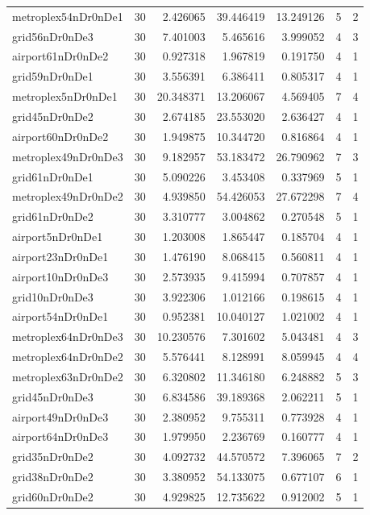 \documentclass[../../../thesis.tex]{subfiles}
\begin{document}
\begin{longtable}{|l|r|r|r|r|r|r|}
metroplex54nDr0nDe1 & 30 & 2.426065 & 39.446419 & 13.249126 & 5 & 2 \\
grid56nDr0nDe3 & 30 & 7.401003 & 5.465616 & 3.999052 & 4 & 3 \\
airport61nDr0nDe2 & 30 & 0.927318 & 1.967819 & 0.191750 & 4 & 1 \\
grid59nDr0nDe1 & 30 & 3.556391 & 6.386411 & 0.805317 & 4 & 1 \\
metroplex5nDr0nDe1 & 30 & 20.348371 & 13.206067 & 4.569405 & 7 & 4 \\
grid45nDr0nDe2 & 30 & 2.674185 & 23.553020 & 2.636427 & 4 & 1 \\
airport60nDr0nDe2 & 30 & 1.949875 & 10.344720 & 0.816864 & 4 & 1 \\
metroplex49nDr0nDe3 & 30 & 9.182957 & 53.183472 & 26.790962 & 7 & 3 \\
grid61nDr0nDe1 & 30 & 5.090226 & 3.453408 & 0.337969 & 5 & 1 \\
metroplex49nDr0nDe2 & 30 & 4.939850 & 54.426053 & 27.672298 & 7 & 4 \\
grid61nDr0nDe2 & 30 & 3.310777 & 3.004862 & 0.270548 & 5 & 1 \\
airport5nDr0nDe1 & 30 & 1.203008 & 1.865447 & 0.185704 & 4 & 1 \\
airport23nDr0nDe1 & 30 & 1.476190 & 8.068415 & 0.560811 & 4 & 1 \\
airport10nDr0nDe3 & 30 & 2.573935 & 9.415994 & 0.707857 & 4 & 1 \\
grid10nDr0nDe3 & 30 & 3.922306 & 1.012166 & 0.198615 & 4 & 1 \\
airport54nDr0nDe1 & 30 & 0.952381 & 10.040127 & 1.021002 & 4 & 1 \\
metroplex64nDr0nDe3 & 30 & 10.230576 & 7.301602 & 5.043481 & 4 & 3 \\
metroplex64nDr0nDe2 & 30 & 5.576441 & 8.128991 & 8.059945 & 4 & 4 \\
metroplex63nDr0nDe2 & 30 & 6.320802 & 11.346180 & 6.248882 & 5 & 3 \\
grid45nDr0nDe3 & 30 & 6.834586 & 39.189368 & 2.062211 & 5 & 1 \\
airport49nDr0nDe3 & 30 & 2.380952 & 9.755311 & 0.773928 & 4 & 1 \\
airport64nDr0nDe3 & 30 & 1.979950 & 2.236769 & 0.160777 & 4 & 1 \\
grid35nDr0nDe2 & 30 & 4.092732 & 44.570572 & 7.396065 & 7 & 2 \\
grid38nDr0nDe2 & 30 & 3.380952 & 54.133075 & 0.677107 & 6 & 1 \\
grid60nDr0nDe2 & 30 & 4.929825 & 12.735622 & 0.912002 & 5 & 1 \\

\end{longtable}
\end{document}
